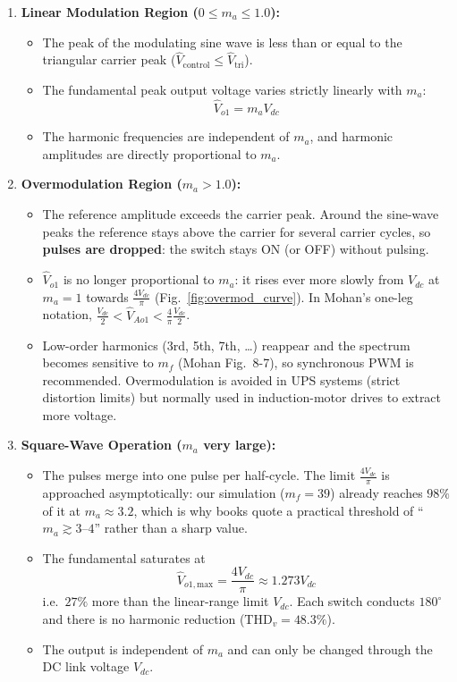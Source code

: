 \documentclass[11pt,a4paper]{article}
\begin{document}
\begin{enumerate}[leftmargin=*]
  \item \textbf{Linear Modulation Region ($0 \le m_a \le 1.0$):}
  \begin{itemize}
    \item The peak of the modulating sine wave is less than or equal to the triangular carrier peak ($\hat{V}_{\text{control}} \le \hat{V}_{\text{tri}}$).
    \item The fundamental peak output voltage varies strictly linearly with $m_a$:
    \begin{equation}
    \hat{V}_{o1} = m_a V_{dc}
    \end{equation}
    \item The harmonic frequencies are independent of $m_a$, and harmonic amplitudes are directly proportional to $m_a$.
  \end{itemize}

  \item \textbf{Overmodulation Region ($m_a > 1.0$):}
  \begin{itemize}
    \item The reference amplitude exceeds the carrier peak. Around the sine-wave peaks the reference stays above the carrier for several carrier cycles, so \textbf{pulses are dropped}: the switch stays ON (or OFF) without pulsing.
    \item $\hat{V}_{o1}$ is no longer proportional to $m_a$: it rises ever more slowly from $V_{dc}$ at $m_a = 1$ towards $\frac{4V_{dc}}{\pi}$ (Fig.~\ref{fig:overmod_curve}). In Mohan's one-leg notation, $\frac{V_{dc}}{2} < \hat{V}_{Ao1} < \frac{4}{\pi}\frac{V_{dc}}{2}$.
    \item Low-order harmonics (3rd, 5th, 7th, \dots) reappear and the spectrum becomes sensitive to $m_f$ (Mohan Fig.~8-7), so synchronous PWM is recommended. Overmodulation is avoided in UPS systems (strict distortion limits) but normally used in induction-motor drives to extract more voltage.
  \end{itemize}

  \item \textbf{Square-Wave Operation ($m_a$ very large):}
  \begin{itemize}
    \item The pulses merge into one pulse per half-cycle. The limit $\frac{4V_{dc}}{\pi}$ is approached asymptotically: our simulation ($m_f = 39$) already reaches $98\%$ of it at $m_a \approx 3.2$, which is why books quote a practical threshold of ``$m_a \gtrsim 3$--$4$'' rather than a sharp value.
    \item The fundamental saturates at
    \begin{equation}
    \hat{V}_{o1,\text{max}} = \frac{4V_{dc}}{\pi} \approx 1.273 V_{dc}
    \end{equation}
    i.e.\ $27\%$ more than the linear-range limit $V_{dc}$. Each switch conducts $180^\circ$ and there is no harmonic reduction ($\text{THD}_v = 48.3\%$).
    \item The output is independent of $m_a$ and can only be changed through the DC link voltage $V_{dc}$.
  \end{itemize}
\end{enumerate}
\end{document}
